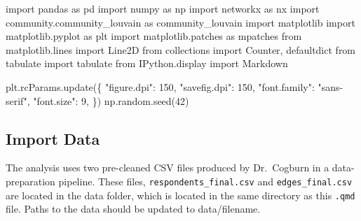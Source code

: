 \documentclass[
  letterpaper,
  DIV=11,
  numbers=noendperiod]{scrartcl}
\newenvironment{Shaded}{\begin{snugshade}}{\end{snugshade}}
\newcommand{\DecValTok}[1]{\textcolor[rgb]{0.68,0.00,0.00}{#1}}
\newcommand{\ImportTok}[1]{\textcolor[rgb]{0.00,0.46,0.62}{#1}}
\newcommand{\NormalTok}[1]{\textcolor[rgb]{0.00,0.23,0.31}{#1}}
\newcommand{\StringTok}[1]{\textcolor[rgb]{0.13,0.47,0.30}{#1}}
\begin{document}
\label{load-libraries}
\begin{Shaded}
\begin{Highlighting}[]
\ImportTok{import}\NormalTok{ pandas }\ImportTok{as}\NormalTok{ pd}
\ImportTok{import}\NormalTok{ numpy }\ImportTok{as}\NormalTok{ np}
\ImportTok{import}\NormalTok{ networkx }\ImportTok{as}\NormalTok{ nx}
\ImportTok{import}\NormalTok{ community.community\_louvain }\ImportTok{as}\NormalTok{ community\_louvain}
\ImportTok{import}\NormalTok{ matplotlib}
\ImportTok{import}\NormalTok{ matplotlib.pyplot }\ImportTok{as}\NormalTok{ plt}
\ImportTok{import}\NormalTok{ matplotlib.patches }\ImportTok{as}\NormalTok{ mpatches}
\ImportTok{from}\NormalTok{ matplotlib.lines }\ImportTok{import}\NormalTok{ Line2D}
\ImportTok{from}\NormalTok{ collections }\ImportTok{import}\NormalTok{ Counter, defaultdict}
\ImportTok{from}\NormalTok{ tabulate }\ImportTok{import}\NormalTok{ tabulate}
\ImportTok{from}\NormalTok{ IPython.display }\ImportTok{import}\NormalTok{ Markdown}

\NormalTok{plt.rcParams.update(\{}
    \StringTok{"figure.dpi"}\NormalTok{: }\DecValTok{150}\NormalTok{,}
    \StringTok{"savefig.dpi"}\NormalTok{: }\DecValTok{150}\NormalTok{,}
    \StringTok{"font.family"}\NormalTok{: }\StringTok{"sans{-}serif"}\NormalTok{,}
    \StringTok{"font.size"}\NormalTok{: }\DecValTok{9}\NormalTok{,}
\NormalTok{\})}
\NormalTok{np.random.seed(}\DecValTok{42}\NormalTok{)}
\end{Highlighting}
\end{Shaded}

\subsection{Import Data}\label{import-data}

The analysis uses two pre-cleaned CSV files produced by Dr.~Cogburn in a
data-preparation pipeline. These files, \texttt{respondents\_final.csv}
and \texttt{edges\_final.csv} are located in the data folder, which is
located in the same directory as this \texttt{.qmd} file. Paths to the
data should be updated to data/filename.
\end{document}
